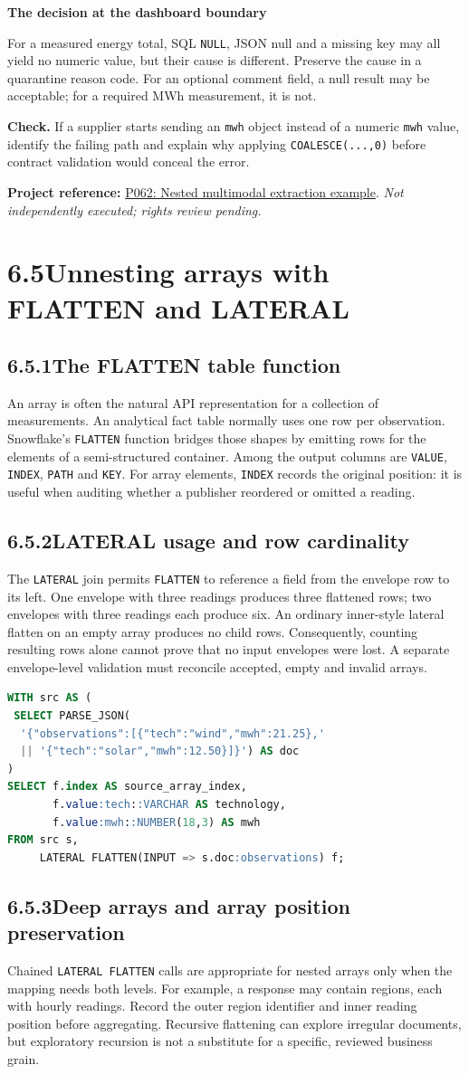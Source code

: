 \documentclass[11pt,twoside]{article}
\newcommand{\topic}[2]{\subsection*{#1\quad #2}}
\newcommand{\repo}[2]{\par\begingroup\fontsize{8.0}{9.6}\selectfont\sffamily\color{inkgray}\textbf{Project reference:} \href{#2}{#1}. \textit{Not independently executed; rights review pending.}\par\endgroup}
\begin{document}
\begin{whitebox}\textbf{The decision at the dashboard boundary}\par
For a measured energy total, SQL \texttt{NULL}, JSON null and a missing key may all yield no numeric value, but their cause is different. Preserve the cause in a quarantine reason code. For an optional comment field, a null result may be acceptable; for a required MWh measurement, it is not.\end{whitebox}
\textbf{Check.} If a supplier starts sending an \texttt{mwh} object instead of a numeric \texttt{mwh} value, identify the failing path and explain why applying \texttt{COALESCE(...,0)} before contract validation would conceal the error.
\repo{P062: Nested multimodal extraction example}{https://github.com/Snowflake-Labs/sfguide-extracting-insights-from-multimodal-customer-data}
\newpage
\section*{6.5\quad Unnesting arrays with FLATTEN and LATERAL}
\topic{6.5.1}{The FLATTEN table function}
An array is often the natural API representation for a collection of measurements. An analytical fact table normally uses one row per observation. Snowflake's \texttt{FLATTEN} function bridges those shapes by emitting rows for the elements of a semi-structured container. Among the output columns are \texttt{VALUE}, \texttt{INDEX}, \texttt{PATH} and \texttt{KEY}. For array elements, \texttt{INDEX} records the original position: it is useful when auditing whether a publisher reordered or omitted a reading.

\topic{6.5.2}{LATERAL usage and row cardinality}
The \texttt{LATERAL} join permits \texttt{FLATTEN} to reference a field from the envelope row to its left. One envelope with three readings produces three flattened rows; two envelopes with three readings each produce six. An ordinary inner-style lateral flatten on an empty array produces no child rows. Consequently, counting resulting rows alone cannot prove that no input envelopes were lost. A separate envelope-level validation must reconcile accepted, empty and invalid arrays.

\begin{lstlisting}[language=SQL,caption={One output row per measurement in an envelope.}]
WITH src AS (
 SELECT PARSE_JSON(
  '{"observations":[{"tech":"wind","mwh":21.25},'
  || '{"tech":"solar","mwh":12.50}]}') AS doc
)
SELECT f.index AS source_array_index,
       f.value:tech::VARCHAR AS technology,
       f.value:mwh::NUMBER(18,3) AS mwh
FROM src s,
     LATERAL FLATTEN(INPUT => s.doc:observations) f;
\end{lstlisting}
\topic{6.5.3}{Deep arrays and array position preservation}
Chained \texttt{LATERAL FLATTEN} calls are appropriate for nested arrays only when the mapping needs both levels. For example, a response may contain regions, each with hourly readings. Record the outer region identifier and inner reading position before aggregating. Recursive flattening can explore irregular documents, but exploratory recursion is not a substitute for a specific, reviewed business grain.
\end{document}
